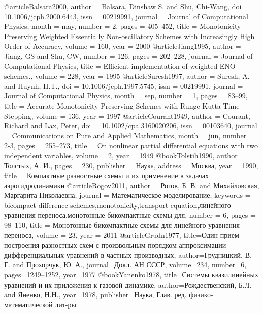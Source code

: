 \documentclass[11pt]{article}
\begin{document}
\begin{thebibliography}{99}
\bibitem
@article{Balsara2000,
author = {Balsara, Dinshaw S. and Shu, Chi-Wang},
doi = {10.1006/jcph.2000.6443},
issn = {00219991},
journal = {Journal of Computational Physics},
month = may,
number = {2},
pages = {405--452},
title = {Monotonicity Preserving Weighted Essentially Non-oscillatory Schemes with Increasingly High Order of Accuracy},
volume = {160},
year = {2000}
}
@article{Jiang1995,
author = {Jiang, GS and Shu, CW},
number = {126},
pages = {202--228},
journal = {Journal of Computational Physics},
title = {Efficient implementation of weighted ENO schemes.},
volume = {228},
year = {1995}
}
@article{Suresh1997,
author = {Suresh, A. and Huynh, H.T.},
doi = {10.1006/jcph.1997.5745},
issn = {00219991},
journal = {Journal of Computational Physics},
month = sep,
number = {1},
pages = {83--99},
title = {Accurate Monotonicity-Preserving Schemes with Runge-Kutta Time Stepping},
volume = {136},
year = {1997}
}
@article{Courant1949,
author = {Courant, Richard and Lax, Peter},
doi = {10.1002/cpa.3160020206},
issn = {00103640},
journal = {Communications on Pure and Applied Mathematics},
month = jun,
number = {2-3},
pages = {255--273},
title = {On nonlinear partial differential equations with two independent variables},
volume = {2},
year = {1949}
}
@book{Tolstih1990,
author = {Толстых, А. И.},
pages = {230},
publisher = {Наука},
address = {Москва},
year = {1990},
title = {Компактные разностные схемы и их применение в задачах аэрогидродинамики}
}
@article{Rogov2011,
author = {Рогов, Б. В. and Михайловская, Маргарита Николаевна},
journal = {Математическое моделирование},
keywords = {bicompact difference schemes,monotonicity,transport equation,линейного уравнения переноса,монотонные бикомпактные схемы для},
number = {6},
pages = {98--110},
title = {Монотонные бикомпактные схемы для линейного уравнения переноса},
volume = {23},
year = {2011}
}
@article{Grudn1977,
  title={Один прием построения разностных схем с произвольным порядком аппроксимации дифференциальных уравнений в частных производных},
  author={Грудницкий, В. Г. and Прохорчук, Ю. А.},
  journal={Докл. АН СССР},
  volume={234},
  number={6},
  pages={1249--1252},
  year={1977}
}
@book{Yanenko1978,
  title={Системы квазилинейных уравнений и их приложения к газовой динамике},
  author={Рождественский, Б.Л. and Яненко, Н.Н.},
  year={1978},
  publisher={Наука, Глав. ред. физико-математической лит-ры}
}


\end{thebibliography}
\end{document}
